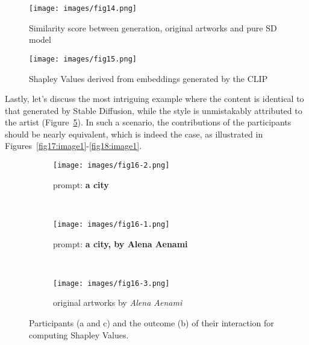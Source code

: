 \documentclass[12pt, letterpaper]{article}
\begin{document}
\begin{figure}[h]
    \centering
    \begin{minipage}{0.55\textwidth}
        \centering
        \texttt{[image: images/fig14.png]}
        \caption{Similarity score between generation, original artworks and pure SD model}
        \label{fig14:image1}
    \end{minipage}\hfill
    \begin{minipage}{0.40\textwidth}
        \centering
        \texttt{[image: images/fig15.png]}
        \caption{Shapley Values derived from embeddings generated by the CLIP}
        \label{fig15:image1}
    \end{minipage}
\end{figure}

Lastly, let's discuss the most intriguing example where the content is identical to that generated by Stable Diffusion, while the style is unmistakably attributed to the artist (Figure~\ref{fig16:stacked_images}). In such a scenario, the contributions of the participants should be nearly equivalent, which is indeed the case, as illustrated in Figures~\ref{fig17:image1}-\ref{fig18:image1}.

\begin{figure}[h]
    \centering
    
    \begin{subfigure}{0.8\textwidth}
        \centering
        \texttt{[image: images/fig16-2.png]}
        \caption{prompt: \textbf{a city}}
        \label{fig16:sub1}
    \end{subfigure}
    \\
    
    \begin{subfigure}{0.8\textwidth}
        \centering
        \texttt{[image: images/fig16-1.png]}
        \caption{prompt: \textbf{a city, by Alena Aenami}}
        \label{fig16:sub2}
    \end{subfigure}
    \\
   
    \begin{subfigure}{0.8\textwidth}
        \centering
        \texttt{[image: images/fig16-3.png]}
        \caption{original artworks by \textit{Alena Aenami}}
        \label{fig16:sub3}
    \end{subfigure}    

    \caption{Participants (a and c) and the outcome (b) of their interaction for computing Shapley Values.}
    \label{fig16:stacked_images}
\end{figure}
\end{document}
